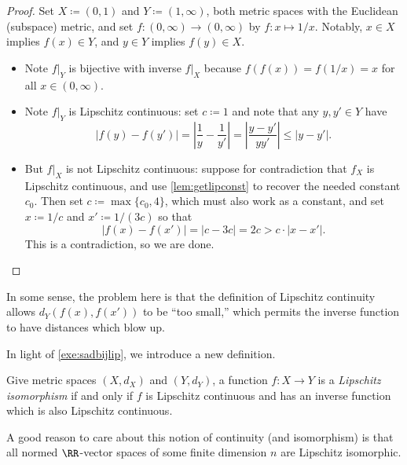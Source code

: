 \documentclass[../notes.tex]{subfiles}
\begin{document}
\begin{proof}
	Set $X\coloneqq(0,1)$ and $Y\coloneqq(1,\infty)$, both metric spaces with the Euclidean (subspace) metric, and set $f\colon(0,\infty)\to(0,\infty)$ by $f\colon x\mapsto1/x$. Notably, $x\in X$ implies $f(x)\in Y$, and $y\in Y$ implies $f(y)\in X$.
	\begin{itemize}
		\item Note $f|_Y$ is bijective with inverse $f|_X$ because $f(f(x))=f(1/x)=x$ for all $x\in(0,\infty)$.
		\item Note $f|_Y$ is Lipschitz continuous: set $c\coloneqq1$ and note that any $y,y'\in Y$ have
		\[|f(y)-f(y')|=\left|\frac1y-\frac1{y'}\right|=\left|\frac{y-y'}{yy'}\right|\le|y-y'|.\]
		\item But $f|_X$ is not Lipschitz continuous: suppose for contradiction that $f_X$ is Lipschitz continuous, and use \autoref{lem:getlipconst} to recover the needed constant $c_0$. Then set $c\coloneqq\max\{c_0,4\}$, which must also work as a constant, and set $x\coloneqq1/c$ and $x'\coloneqq1/(3c)$ so that
		\[|f(x)-f(x')|=\left|c-3c\right|=2c>c\cdot|x-x'|.\]
		This is a contradiction, so we are done.
		\qedhere
	\end{itemize}
\end{proof}
\begin{remark}[Nir]
	In some sense, the problem here is that the definition of Lipschitz continuity allows $d_Y(f(x),f(x'))$ to be ``too small,'' which permits the inverse function to have distances which blow up.
\end{remark}
In light of \autoref{exe:sadbijlip}, we introduce a new definition.
\begin{defihelper} 
	Give metric spaces $(X,d_X)$ and $(Y,d_Y)$, a function $f\colon X\to Y$ is a \textit{Lipschitz isomorphism} if and only if $f$ is Lipschitz continuous and has an inverse function which is also Lipschitz continuous.
\end{defihelper}
\begin{remark}
	A good reason to care about this notion of continuity (and isomorphism) is that all normed $\RR$-vector spaces of some finite dimension $n$ are Lipschitz isomorphic.
\end{remark}
\end{document}
